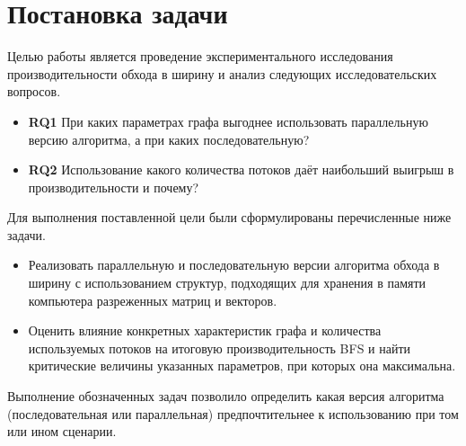 
\section{Постановка задачи}
\label{sec:task}
\noindent Целью работы является проведение экспериментального исследования производительности обхода в ширину и анализ следующих исследовательских вопросов. 

\begin{itemize}
    \item{\textbf{RQ1}\label{rq1}} \newline
    При каких параметрах графа выгоднее использовать параллельную версию алгоритма, а при каких последовательную?
    \item{\textbf{RQ2}\label{rq2}} \newline
    Использование какого количества потоков даёт наибольший выигрыш в производительности и почему?
\end{itemize}

\noindent Для выполнения поставленной цели были сформулированы перечисленные ниже задачи.
 \begin{itemize}
 	\item Реализовать параллельную и последовательную версии алгоритма обхода в ширину с использованием структур, подходящих для хранения в памяти компьютера разреженных матриц и векторов.
 	\item  Оценить влияние конкретных характеристик графа и количества используемых потоков на итоговую производительность BFS и найти критические величины указанных параметров, при которых она максимальна.
 \end{itemize}

\noindent Выполнение обозначенных задач позволило определить какая версия алгоритма (последовательная или параллельная) предпочтительнее к использованию при том или ином сценарии.
